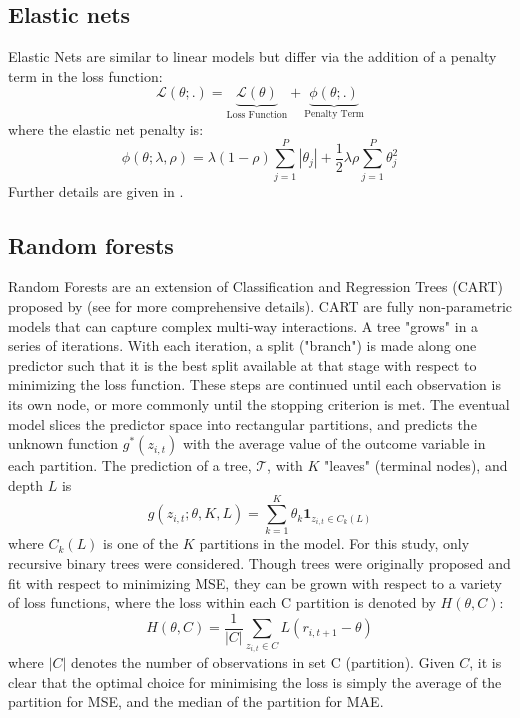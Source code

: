 \documentclass{article}
\begin{document}
\subsection{Elastic nets}
Elastic Nets are similar to linear models but differ via the addition of a penalty term in the loss function:
\begin{equation}
\mathcal{L(\theta;.)} = 
\underset{\text{Loss Function}}{\underbrace{\mathcal{L(\theta)}}} + 
\underset{\text{Penalty Term}}{\underbrace{\phi(\theta;.)}}
\end{equation}
where the elastic net penalty \cite{zou_regularization_2005} is:
\begin{equation}
\phi(\theta;\lambda,\rho) = 
\lambda(1-\rho) \sum_{j = 1}^{P}|\theta_j| +
\frac{1}{2} \lambda \rho \sum_{j = 1}^{P}\theta_j^2
\end{equation}
Further details are given in \cite{zou_regularization_2005}.

\subsection{Random forests}
Random Forests are an extension of Classification and Regression Trees (CART) proposed by \cite{breiman_random_2001} (see for more comprehensive details). CART are fully non-parametric models that can capture complex multi-way interactions. A tree "grows" in a series of iterations. With each iteration, a split ("branch") is made along one predictor such that it is the best split available at that stage with respect to minimizing the loss function. These steps are continued until each observation is its own node, or more commonly until the stopping criterion is met. The eventual model slices the predictor space into rectangular partitions, and predicts the unknown function $g^*(z_{i,t})$ with the average value of the outcome variable in each partition. The prediction of a tree, $\mathcal{T}$, with \(K\) "leaves" (terminal nodes), and depth $L$ is
\begin{equation}
g(z_{i,t};\theta,K,L) = \sum_{k=1}^{K}\theta_k\textbf{1}_{z_{i,t}\in C_k(L)}
\end{equation}
where $C_k(L)$ is one of the $K$ partitions in the model. For this study, only recursive binary trees were considered. Though trees were originally proposed and fit with respect to minimizing MSE, they can be grown with respect to a variety of loss functions, where the loss within each C partition is denoted by $H(\theta, C)$: 
\begin{equation}
H(\theta, C) = \frac{1}{|C|} \sum_{z_{i,t} \in C} L(r_{i,t+1} - \theta)
\end{equation} 
where $|C|$ denotes the number of observations in set C (partition). Given $C$, it is clear that the optimal choice for minimising the loss is simply the average of the partition for MSE, and the median of the partition for MAE.
\end{document}
